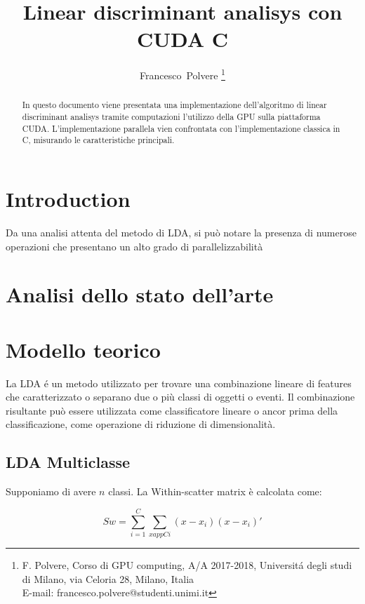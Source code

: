 \documentclass[twocolumn]{article}
\begin{document}
	\title{Linear discriminant analisys con CUDA C}
	\author{Francesco~Polvere
		\thanks{F. Polvere, Corso di GPU computing,  A/A 2017-2018, Universit\'a degli studi di Milano,
			via Celoria 28, Milano, Italia \protect\\
			E-mail: francesco.polvere@studenti.unimi.it}%
	}
	\maketitle
	\begin{abstract}
		In questo documento viene presentata una implementazione dell'algoritmo di linear discriminant analisys tramite computazioni l'utilizzo della GPU sulla piattaforma CUDA. 
		L'implementazione parallela vien confrontata con l'implementazione classica in C, misurando le caratteristiche principali.
	
	
\end{abstract}
\section{Introduction}
Da una analisi attenta del metodo di LDA, si può notare la presenza di numerose operazioni che presentano un alto grado di parallelizzabilità
\section{Analisi dello stato dell'arte}
\lipsum[1-2]
\section{Modello teorico}
La LDA \'e un metodo utilizzato per trovare una combinazione lineare di features che caratterizzato o separano due o più classi di oggetti o eventi. Il combinazione risultante può essere utilizzata  come classificatore lineare o ancor prima della classificazione, come operazione di riduzione di dimensionalità.
\subsection{LDA Multiclasse}
Supponiamo di avere \(n\) classi. La Within-scatter matrix è calcolata come:

\[Sw = \sum_{i=1}^{C}\sum_{x app Ci }(x-x_{i})(x-x_{i})'\]
\end{document}

